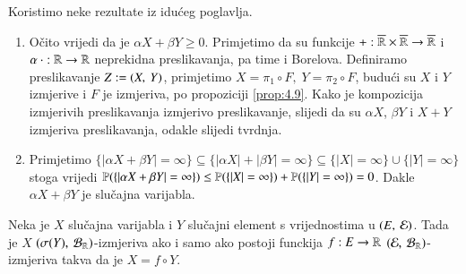 \begin{rj}[\ref{zad:3.19}]
    Koristimo neke rezultate iz idu\' ceg poglavlja.
    \begin{figure}[H]
        \centering
    \end{figure}
    \begin{enumerate}[label=(\roman*)]
        \item O\v cito vrijedi da je $\alpha X + \beta Y \geq 0$.
        Primjetimo da su funkcije $+ : \overline{\mathbb{R}} \times \overline{\mathbb{R}} \to \overline{\mathbb{R}}$ i $\alpha \: \cdot : \mathbb{R} \to \mathbb{R}$ neprekidna preslikavanja, pa time i Borelova.
        Definiramo preslikavanje $Z := ({X}, \: {Y})$, primjetimo $X = \pi_1 \circ F, \; Y = \pi_2 \circ F$, budu\' ci su $X$ i $Y$ izmjerive i $F$ je izmjeriva, po propoziciji \ref{prop:4.9}.
        Kako je kompozicija izmjerivih preslikavanja izmjerivo preslikavanje, slijedi da su $\alpha X$, $\beta Y$ i $X + Y$ izmjeriva preslikavanja, odakle slijedi tvrdnja.
        \item Primjetimo $\{ | \alpha X + \beta Y | = \infty \} \subseteq \{ |\alpha X| + |\beta Y| = \infty \} \subseteq \{|X| = \infty\} \cup \{ |Y| = \infty \}$ stoga vrijedi $\mathbb{P}({ \{ | \alpha X + \beta Y | = \infty \} }) \leq \mathbb{P}({\{|X| = \infty\}}) + \mathbb{P}({\{|Y| = \infty\}}) = 0$.
        Dakle $\alpha X + \beta Y$ je slu\v cajna varijabla.
    \end{enumerate}
\end{rj}

\begin{zad} \label{zad:3.20}
    Neka je $X$ slu\v cajna varijabla i $Y$ slu\v cajni element s vrijednostima u $(E, \: \mathcal{E})$.
    Tada je $X$ $(\sigma({Y}), \: \mathcal{B}_{\mathbb{R}})$-izmjeriva ako i samo ako postoji funckija $f: E \to \mathbb{R}$ $(\mathcal{E}, \: \mathcal{B}_{\mathbb{R}})$-izmjeriva takva da je $X = f \circ Y$.
\end{zad}


